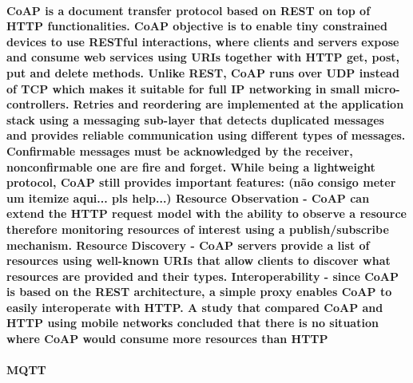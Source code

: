 \paragraph{
	\ac{CoAP} is a document transfer protocol based on \ac{REST} on top of \ac{HTTP} functionalities. \ac{CoAP} objective is to enable tiny constrained devices to use RESTful interactions, where clients and servers expose and consume web services using \ac{URIs} together with  \ac{HTTP} get, post, put and delete methods. Unlike \ac{REST}, \ac{CoAP} runs over \ac{UDP} instead of \ac{TCP} which makes it suitable for full IP networking in small micro-controllers. Retries and reordering are implemented at the application stack using a messaging sub-layer that detects duplicated messages and provides reliable communication using different types of messages. Confirmable messages must be acknowledged by the receiver, nonconfirmable one are fire and forget. While being a lightweight protocol, \ac{CoAP} still provides important features: (não consigo meter um itemize aqui... pls help...)
Resource Observation - \ac{CoAP} can extend the \ac{HTTP} request model with the ability to observe a resource therefore monitoring resources of interest using a publish/subscribe mechanism.
Resource Discovery - \ac{CoAP} servers provide a list of resources using well-known {URIs} that allow clients to discover what resources are provided and their types.
Interoperability - since \ac{CoAP} is based on the \ac{REST} architecture, a simple proxy enables \ac{CoAP} to easily interoperate with \ac{HTTP}.
A study that compared \ac{CoAP} and \ac{HTTP} using mobile networks concluded that there is no situation where \ac{CoAP} would consume more resources than \ac{HTTP} \cite{Savolainen2014}
}

\paragraph{\textbf{\ac{MQTT}}}
